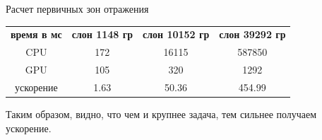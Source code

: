\begin{center}
Расчет первичных зон отражения
\begin{tabular}{cccc}
\textbf{время в мс}		& \textbf{слон 1148 гр} 			& \textbf{слон 10152 гр}		& \textbf{слон 39292 гр} 		\\
CPU 							& 172					 				& 16115								& 587850			 						\\
GPU 							& 105									& 	320								& 1292									\\
ускорение 					& 1.63								& 50.36								& 454.99 									\\
\end{tabular}
\end{center}

Таким образом, видно, что чем и крупнее задача, тем сильнее получаем ускорение. 



